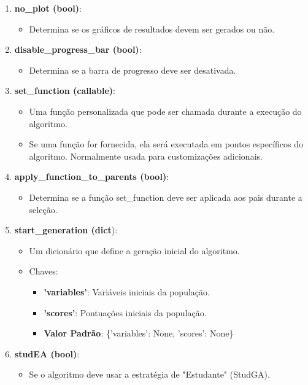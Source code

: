 \documentclass[a4paper, 12pt]{article}
\begin{document}
\begin{enumerate}
    \item \textbf{no\_plot (bool)}:
    \begin{itemize}
        \item Determina se os gráficos de resultados devem ser gerados ou não.
    \end{itemize}
    \item \textbf{disable\_progress\_bar (bool)}:
    \begin{itemize}
        \item Determina se a barra de progresso deve ser desativada.
    \end{itemize}
    \item \textbf{set\_function (callable)}:
    \begin{itemize}
        \item Uma função personalizada que pode ser chamada durante a execução do algoritmo.
        \item Se uma função for fornecida, ela será executada em pontos específicos do algoritmo. Normalmente usada para customizações adicionais.
    \end{itemize}
    \item \textbf{apply\_function\_to\_parents (bool)}:
    \begin{itemize}
        \item Determina se a função set\_function deve ser aplicada aos pais durante a seleção.
    \end{itemize}
    \item \textbf{start\_generation (dict}):
    \begin{itemize}
        \item Um dicionário que define a geração inicial do algoritmo.
        \item Chaves: 
        \begin{itemize}
            \item \textbf{'variables'}: Variáveis iniciais da população.
            \item \textbf{'scores'}: Pontuações iniciais da população.
            \item \textbf{Valor Padrão}: \{'variables': None, 'scores': None\}
        \end{itemize}
    \end{itemize}
    \item \textbf{studEA (bool)}:
    \begin{itemize}
        \item Se o algoritmo deve usar a estratégia de "Estudante" (StudGA).

\end{itemize}
\end{enumerate}
\end{document}
